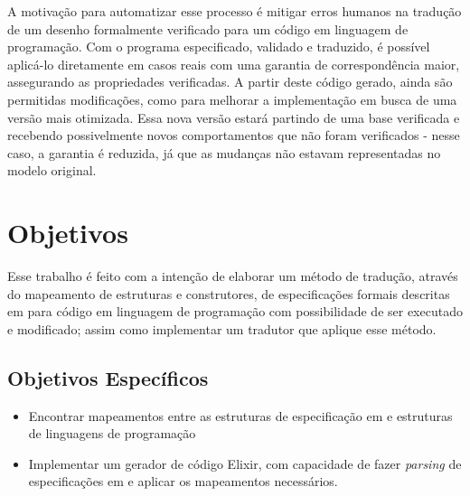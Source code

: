 A motivação para automatizar esse processo é mitigar erros humanos na tradução de um desenho formalmente verificado para um código em linguagem de programação. Com o programa especificado, validado e traduzido, é possível aplicá-lo diretamente em casos reais com uma garantia de correspondência maior, assegurando as propriedades verificadas. A partir deste código gerado, ainda são permitidas modificações, como para melhorar a implementação em busca de uma versão mais otimizada. Essa nova versão estará partindo de uma base verificada e recebendo possivelmente novos comportamentos que não foram verificados - nesse caso, a garantia é reduzida, já que as mudanças não estavam representadas no modelo original.

\section{Objetivos}

Esse trabalho é feito com a intenção de elaborar um método de tradução, através do mapeamento de estruturas e construtores, de especificações formais descritas em \TLA para código em linguagem de programação com possibilidade de ser executado e modificado; assim como implementar um tradutor que aplique esse método.

\subsection{Objetivos Específicos}
\begin{itemize}
  \item Encontrar mapeamentos entre as estruturas de especificação em \TLA e estruturas de linguagens de programação
  \item Implementar um gerador de código Elixir, com capacidade de fazer \textit{parsing} de especificações em \TLA e aplicar os mapeamentos necessários.
\end{itemize}

